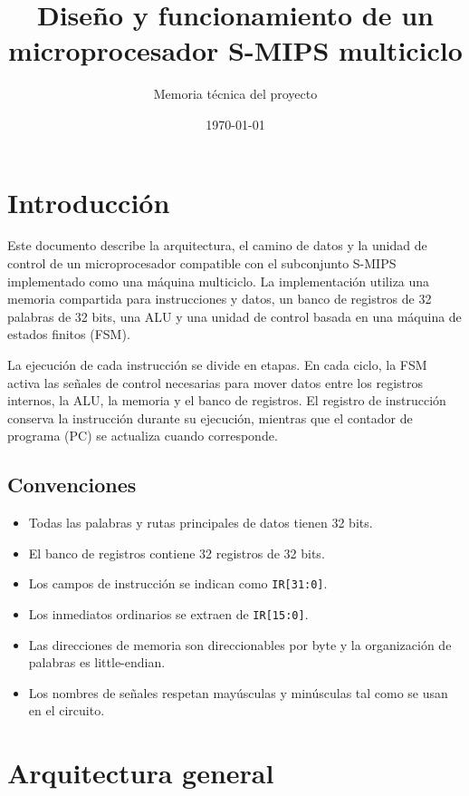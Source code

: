 \documentclass[11pt,a4paper]{article}
\title{\textbf{Diseño y funcionamiento de un microprocesador S-MIPS multiciclo}}
\author{Memoria técnica del proyecto}
\date{\today}
\begin{document}
\maketitle


\section{Introducción}

Este documento describe la arquitectura, el camino de datos y la unidad de control de un microprocesador compatible con el subconjunto S-MIPS implementado como una máquina multiciclo. La implementación utiliza una memoria compartida para instrucciones y datos, un banco de registros de 32 palabras de 32 bits, una ALU y una unidad de control basada en una máquina de estados finitos (FSM).

La ejecución de cada instrucción se divide en etapas. En cada ciclo, la FSM activa las señales de control necesarias para mover datos entre los registros internos, la ALU, la memoria y el banco de registros. El registro de instrucción conserva la instrucción durante su ejecución, mientras que el contador de programa (PC) se actualiza cuando corresponde.

\subsection{Convenciones}
\begin{itemize}[nosep]
  \item Todas las palabras y rutas principales de datos tienen 32 bits.
  \item El banco de registros contiene 32 registros de 32 bits.
  \item Los campos de instrucción se indican como \texttt{IR[31:0]}.
  \item Los inmediatos ordinarios se extraen de \texttt{IR[15:0]}.
  \item Las direcciones de memoria son direccionables por byte y la organización de palabras es little-endian.
  \item Los nombres de señales respetan mayúsculas y minúsculas tal como se usan en el circuito.
\end{itemize}

\section{Arquitectura general}
\end{document}

